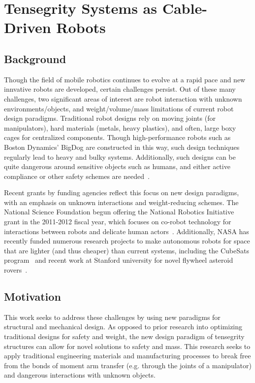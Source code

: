 \documentclass[12pt]{report}
\begin{document}
\chapter{Tensegrity Systems as Cable-Driven Robots}

\section{Background}

Though the field of mobile robotics continues to evolve at a rapid pace and new innvative robots are developed, certain challenges persist.
Out of these many challenges, two significant areas of interest are robot interaction with unknown environments/objects, and weight/volume/mass limitations of current robot design paradigms.
Traditional robot designs rely on moving joints (for manipulators), hard materials (metals, heavy plastics), and often, large boxy cages for centralized components.
Though high-performance robots such as Boston Dynamics' BigDog \cite{raibert2008bigdog} are constructed in this way, such design techniques regularly lead to heavy and bulky systems.
Additionally, such designs can be quite dangerous around sensitive objects such as humans, and either active compliance or other safety schemes are needed~\cite{garcia2007evolution,lefebvre2005active}.

Recent grants by funding agencies reflect this focus on new design paradigms, with an emphasis on unknown interactions and weight-reducing schemes.
The National Science Foundation begun offering the National Robotics Initiative grant in the 2011-2012 fiscal year, which focuses on co-robot technology for interactions between robots and delicate human actors~\cite{nsf2014national}.
Additionally, NASA has recently funded numerous research projects to make autonomous robots for space that are lighter (and thus cheaper) than current systems, including the CubeSats program~\cite{chin2008standardization,selva2012survey} and recent work at Stanford university for novel flywheel asteroid rovers~\cite{allen2013internally}.


\section{Motivation}
This work seeks to address these challenges by using new paradigms for structural and mechanical design.
As opposed to prior research into optimizing traditional designs for safety and weight, the new design paradigm of tensegrity structures can allow for novel solutions to safety and mass.
This research seeks to apply traditional engineering materials and manufacturing processes to break free from the bonds of moment arm transfer (e.g. through the joints of a manipulator) and dangerous interactions with unknown objects.
\end{document}
